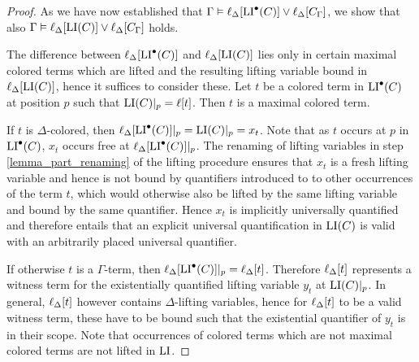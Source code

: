 \begin{proof}

	As we have now established that
	$\Gamma \vDash \ell_{\Delta}[ \operatorname{LI}^\bullet(C) ] \lor \ell_{\Delta}[C_\Gamma]$,
	we show that also
	$\Gamma \vDash \ell_{\Delta}[ \operatorname{LI}(C) ] \lor \ell_{\Delta}[C_\Gamma]$ holds.


	The difference between $\ell_{\Delta}[\operatorname{LI}^\bullet(C)]$ and $\ell_{\Delta}[\operatorname{LI}(C)]$ lies only in certain maximal colored terms which are lifted and the resulting lifting variable bound in $\ell_{\Delta}[\operatorname{LI}(C)]$, hence it suffices to consider these.
	Let $t$ be a colored term in $\operatorname{LI}^\bullet(C)$ at position $p$ such that $\operatorname{LI}(C)|_{p} = \ell[t]$.
	Then $t$ is a maximal colored term. %

	If $t$ is $\Delta$-colored, then $\ell_{\Delta}[\operatorname{LI}^\bullet(C)]|_{p} = \operatorname{LI}(C)|_{p} = x_t$.
	Note that as $t$ occurs at $p$ in $\operatorname{LI}^\bullet(C)$, $x_t$ occurs free at $\ell_{\Delta}[\operatorname{LI}^\bullet(C)]|_{p}$.
	The renaming of lifting variables in step \ref{lemma_part_renaming} of the lifting procedure
	ensures that $x_t$ is a fresh lifting variable and hence is not bound by quantifiers introduced to to other occurrences of the term $t$, which would otherwise also be lifted by the same lifting variable and bound by the same quantifier.
	Hence $x_t$ is implicitly universally quantified and therefore entails that an explicit universal quantification in $\operatorname{LI}(C)$ is valid with an arbitrarily placed universal quantifier. 

	If otherwise $t$ is a $\Gamma$-term, then $\ell_{\Delta}[\operatorname{LI}^\bullet(C)]|_{p} = \ell_{\Delta}[t]$.
	Therefore $\ell_{\Delta}[t]$ represents a witness term for the existentially quantified lifting variable $y_t$ at $\operatorname{LI}(C)|_{p}$.
	In general, $\ell_{\Delta}[t]$ however contains $\Delta$-lifting variables, hence for $\ell_{\Delta}[t]$ to be a valid witness term, these have to be bound such that the existential quantifier of $y_t$ is in their scope.
	Note that occurrences of colored terms which are not maximal colored terms are not lifted in $\operatorname{LI}$.


\end{proof}
